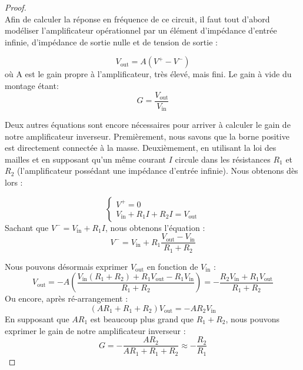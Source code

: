 \documentclass	[11pt, a4paper, openany]{book}
\begin{document}
\begin{proof}\ \\
Afin de calculer la réponse en fréquence de ce circuit, il faut tout d'abord modéliser
    l'amplificateur opérationnel par un élément d'impédance d'entrée infinie, d'impédance
    de sortie nulle et de tension de sortie :
    
        \begin{equation}
        V_{\text{out}}=A(V^+ - V^-)
        \end{equation}
    où A est le gain propre à l'amplificateur, très élevé, mais fini. Le gain à vide du montage
    étant:
        \begin{equation}
        G = \frac{V_{\text{out}}}{V_{\text{in}}}
        \end{equation}
    
    Deux autres équations sont encore nécessaires pour arriver à  calculer le gain de notre
    amplificateur inverseur. Premièrement, nous savons que la borne positive est directement
    connectée à la masse. Deuxièmement, en utilisant la loi des mailles et en supposant qu'un
    même courant $I$ circule dans les résistances $R_1$ et $R_2$ (l'amplificateur possédant
    une impédance d'entrée infinie). Nous obtenons dès lors :

        \begin{equation}
            \left\{\begin{array}{l}
             V^+=0  \\
             V_{\text{in}}+R_1 I + R_2 I = V_{\text{out}}
            \end{array}\right.
        \end{equation}
    Sachant que $V^-=V_{\text{in}}+R_1 I$, nous obtenons l'équation :
        \begin{equation}
        V^-=V_{\text{in}}+R_1\frac{V_{\text{out}}-V_{\text{in}}}{R_1+R_2}
        \end{equation}

    Nous pouvons désormais exprimer $V_{\text{out}}$ en fonction de $V_{\text{in}}$ :
        \begin{equation}
        V_{\text{out}}=-A\left( \dfrac{V_{\text{in}}(R_1+R_2)+R_1 V_{\text{out}}-R_1 V_{\text{in}}}{R_1+R_2}\right) = -\dfrac{R_2 V_{\text{in}}+R_1 V_{\text{out}}}{R_1+R_2}
        \end{equation}
    Ou encore, après ré-arrangement :
        \begin{equation}
        (A R_1 + R_1 + R_2) V_{\text{out}} = -A R_2 V_{\text{in}}
        \end{equation}
    En supposant que $A R_1$ est beaucoup plus grand que $R_1 + R_2$, nous pouvons exprimer le 
    gain de notre amplificateur inverseur :
     \begin{equation}
     G =-\frac{A R_2}{A R_1 + R_1 + R_2} \approx -\frac{R_2}{R_1}
     \label{eq:gain}
     \end{equation}
\end{proof}
\end{document}
